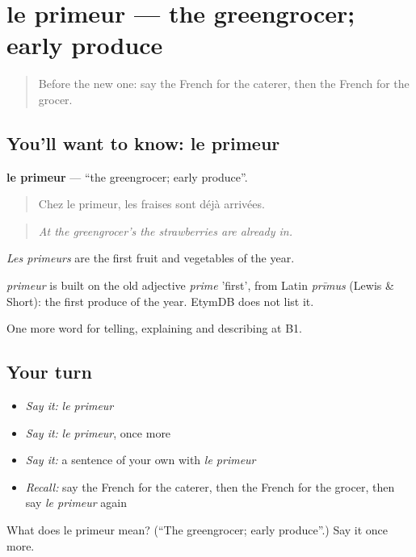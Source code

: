 \section[le primeur]{le primeur — the greengrocer; early produce}

\label{lesson:FR-C444-primeur}



\begin{quote}
Before the new one: say the French for the caterer, then the French for the grocer.
\end{quote}

\subsection*{You'll want to know: le primeur}
\textbf{le primeur} — \textquotedblleft{}the greengrocer; early produce\textquotedblright{}.

\begin{quote}
Chez le primeur, les fraises sont déjà arrivées.
\end{quote}

\begin{quote}
\emph{At the greengrocer's the strawberries are already in.}
\end{quote}

\emph{Les primeurs} are the first fruit and vegetables of the year.

\begin{cousinweb}
\emph{primeur} is built on the old adjective \emph{prime} 'first', from Latin \emph{prīmus} (Lewis \& Short): the first produce of the year. EtymDB does not list it.
\end{cousinweb}

\begin{grammarlens}[title={What you've built}]
One more word for telling, explaining and describing at B1.
\end{grammarlens}

\subsection*{Your turn}
\begin{itemize}
\raggedright
  \item \emph{Say it:} \emph{le primeur}
  \item \emph{Say it:} \emph{le primeur}, once more
  \item \emph{Say it:} a sentence of your own with \emph{le primeur}
  \item \emph{Recall:} say the French for the caterer, then the French for the grocer, then say \emph{le primeur} again
\end{itemize}

\begin{tcolorbox}[breakable,colback=teal!4,colframe=teal!35!black,title={Before you move on}]
What does le primeur mean? (\textquotedblleft{}The greengrocer; early produce\textquotedblright{}.) Say it once more.
\end{tcolorbox}
